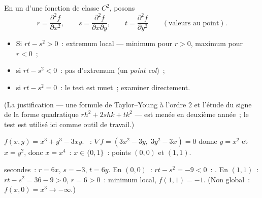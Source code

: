 \begin{method}\label{met:b1:multivar:monge}
En un  d'une fonction de classe $C^2$, posons
\[
r = \frac{\partial^2 f}{\partial x^2},
\qquad
s = \frac{\partial^2 f}{\partial x \partial y},
\qquad
t = \frac{\partial^2 f}{\partial y^2}
\qquad (\text{valeurs au point}).
\]
\begin{itemize}
  \item Si $rt - s^2 > 0$~: extremum local --- minimum pour $r > 0$,
        maximum pour $r < 0$~;
  \item si $rt - s^2 < 0$~: pas d'extremum (un \emph{point
        col})~;
  \item si $rt - s^2 = 0$~: le test est muet~; examiner
        directement.
\end{itemize}
(La justification --- une formule de Taylor--Young à l'ordre $2$ et
l'étude du signe de la forme quadratique $r h^2 + 2shk + tk^2$ ---
est menée en deuxième année~; le test est utilisé ici comme outil
de travail.)
\end{method}

\begin{example}\label{ex:b1:multivar:extrema}
$f(x,y) = x^3 + y^3 - 3xy$. ~: $\nabla f = (3x^2 -
3y,\; 3y^2 - 3x) = 0$ donne $y = x^2$ et $x = y^2$, donc $x = x^4$~:
$x \in \{0, 1\}$~: points $(0,0)$ et $(1,1)$.

 secondes~: $r = 6x$, $s = -3$, $t = 6y$. En $(0,0)$~: $rt -
s^2 = -9 < 0$~: . En $(1,1)$~: $rt - s^2 = 36 - 9 > 0$, $r = 6
> 0$~: minimum local, $f(1,1) = -1$. (Non global~: $f(x, 0) = x^3 \to
-\infty$.)
\end{example}

